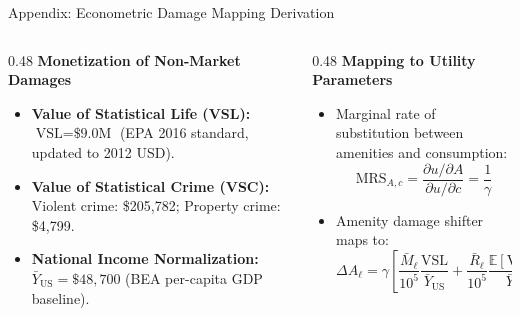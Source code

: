 \documentclass[aspectratio=169, 10pt]{beamer}
\begin{document}
\begin{frame}{Appendix: Econometric Damage Mapping Derivation \hfill \hyperlink{main:damage_mapping}{\scriptsize{}}}\label{backup:damage_derivation}
    \begin{columns}[T]
        \begin{column}{0.48\textwidth}
            \textbf{\small Monetization of Non-Market Damages}
            \vspace{0.05cm}
            \begin{itemize}\scriptsize\setlength{\itemsep}{2pt}
                \item \textbf{Value of Statistical Life (VSL):}
                $\text{VSL} = \text{\$9.0M}$ (EPA 2016 standard, updated to 2012 USD).
                \item \textbf{Value of Statistical Crime (VSC):}
                Violent crime: \$205,782; Property crime: \$4,799.
                \item \textbf{National Income Normalization:}
                $\bar{Y}_{\text{US}} = \$48,700$ (BEA per-capita GDP baseline).
            \end{itemize}
        \end{column}
        \begin{column}{0.48\textwidth}
            \textbf{\small Mapping to Utility Parameters}
            \vspace{0.05cm}
            \begin{itemize}\scriptsize\setlength{\itemsep}{2pt}
                \item Marginal rate of substitution between amenities and consumption:
                $$\text{MRS}_{A,c} = \frac{\partial u / \partial A}{\partial u / \partial c} = \frac{1}{\gamma}$$
                \item Amenity damage shifter maps to:
                $$\Delta A_\ell = \gamma \left[ \frac{\bar M_\ell}{10^5} \frac{\text{VSL}}{\bar Y_{\text{US}}} + \frac{\bar R_\ell}{10^5} \frac{\mathbb{E}[\text{VSC}]}{\bar Y_{\text{US}}} \right]$$
            \end{itemize}
        \end{column}
    \end{columns}
\end{frame}
\end{document}
